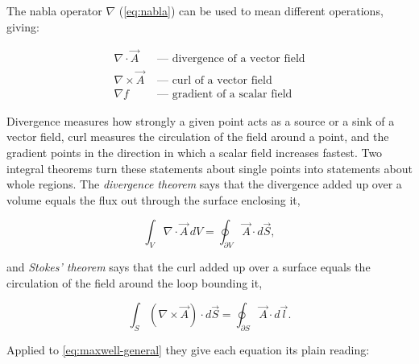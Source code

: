         The nabla operator $\nabla$ (\cref{eq:nabla}) can be used to mean different operations, giving:

        \begin{equation*}
            \begin{aligned}
                \nabla \cdot \vec{A} &\text{ --- divergence of a vector field}\\
                \nabla \times \vec{A} &\text{ --- curl of a vector field}\\
                \nabla f &\text{ --- gradient of a scalar field}
            \end{aligned}
        \end{equation*}

        Divergence measures how strongly a given point acts as a source or a sink of a vector field, curl measures the circulation of the field around a point, and the gradient points in the direction in which a scalar field increases fastest. Two integral theorems turn these statements about single points into statements about whole regions. The \emph{divergence theorem} says that the divergence added up over a volume equals the flux out through the surface enclosing it,

        \begin{equation}\label{eq:divergence-theorem}
            \int_{V}\nabla\cdot\vec{A}\,dV = \oint_{\partial V}\vec{A}\cdot d\vec{S},
        \end{equation}

        and \emph{Stokes' theorem} says that the curl added up over a surface equals the circulation of the field around the loop bounding it,

        \begin{equation}\label{eq:stokes-theorem}
            \int_{S}\left(\nabla\times\vec{A}\right)\cdot d\vec{S} = \oint_{\partial S}\vec{A}\cdot d\vec{l} .
        \end{equation}

        Applied to \cref{eq:maxwell-general} they give each equation its plain reading:

